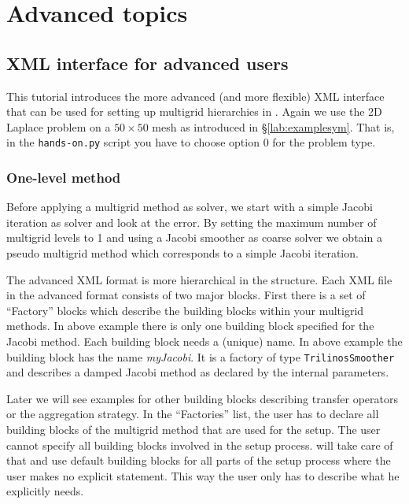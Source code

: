 \documentclass[10pt,fleqn]{book}
\begin{document}
\part{Advanced topics}

\chapter{XML interface for advanced users}

This tutorial introduces the more advanced (and more flexible) XML interface that can be used for setting up multigrid hierarchies in \muelu.
Again we use the 2D Laplace problem on a $50\times 50$ mesh as introduced in \S\ref{lab:examplesym}. That is, in the \verb|hands-on.py| script  you have to choose option 0 for the problem type.


\section{One-level method}
Before applying a multigrid method as solver, we start with a simple Jacobi iteration as solver and look at the error. By setting the maximum number of multigrid levels to 1 and using a Jacobi smoother as coarse solver we obtain a pseudo multigrid method which corresponds to a simple Jacobi iteration.



The advanced XML format is more hierarchical in the structure. Each XML file in the advanced format consists of two major blocks. First there is a set of ``Factory'' blocks which describe the building blocks within your multigrid methods. In above example there is only one building block specified for the Jacobi method. Each building block needs a (unique) name. In above example the building block has the name \textit{myJacobi}. It is a factory of type \verb|TrilinosSmoother| and describes a damped Jacobi method as declared by the internal parameters.

Later we will see examples for other building blocks describing transfer operators or the aggregation strategy.
In the ``Factories'' list, the user has to declare all building blocks of the multigrid method that are used for the setup. The user cannot specify all building blocks involved in the setup process. \muelu will take care of that and use default building blocks for all parts of the setup process where the user makes no explicit statement. This way the user only has to describe what he explicitly needs.
\end{document}
